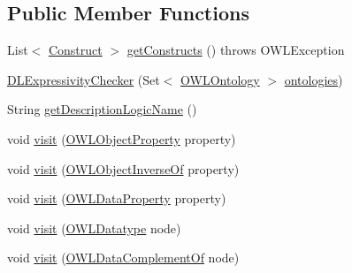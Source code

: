 \subsection*{Public Member Functions}
\begin{DoxyCompactItemize}
\item 
List$<$ \hyperlink{enumorg_1_1semanticweb_1_1owlapi_1_1util_1_1_d_l_expressivity_checker_1_1_construct}{Construct} $>$ \hyperlink{classorg_1_1semanticweb_1_1owlapi_1_1util_1_1_d_l_expressivity_checker_a150225c2aaba844ce7d5bb4d0683c54b}{get\-Constructs} ()  throws O\-W\-L\-Exception 
\item 
\hyperlink{classorg_1_1semanticweb_1_1owlapi_1_1util_1_1_d_l_expressivity_checker_a9a9394efa40a370173acb3d96f9e15b4}{D\-L\-Expressivity\-Checker} (Set$<$ \hyperlink{interfaceorg_1_1semanticweb_1_1owlapi_1_1model_1_1_o_w_l_ontology}{O\-W\-L\-Ontology} $>$ \hyperlink{classorg_1_1semanticweb_1_1owlapi_1_1util_1_1_d_l_expressivity_checker_affc39ee4929c0905abba809420579080}{ontologies})
\item 
String \hyperlink{classorg_1_1semanticweb_1_1owlapi_1_1util_1_1_d_l_expressivity_checker_a889d2e2ab26836bf4e107708d6773270}{get\-Description\-Logic\-Name} ()
\item 
void \hyperlink{classorg_1_1semanticweb_1_1owlapi_1_1util_1_1_d_l_expressivity_checker_a28212e633db3aa51d531532738fce409}{visit} (\hyperlink{interfaceorg_1_1semanticweb_1_1owlapi_1_1model_1_1_o_w_l_object_property}{O\-W\-L\-Object\-Property} property)
\item 
void \hyperlink{classorg_1_1semanticweb_1_1owlapi_1_1util_1_1_d_l_expressivity_checker_aa2f54bcffa42a83a740903681c5fcdc4}{visit} (\hyperlink{interfaceorg_1_1semanticweb_1_1owlapi_1_1model_1_1_o_w_l_object_inverse_of}{O\-W\-L\-Object\-Inverse\-Of} property)
\item 
void \hyperlink{classorg_1_1semanticweb_1_1owlapi_1_1util_1_1_d_l_expressivity_checker_a3844e006dcc4d0baafc650dcc43cf8d1}{visit} (\hyperlink{interfaceorg_1_1semanticweb_1_1owlapi_1_1model_1_1_o_w_l_data_property}{O\-W\-L\-Data\-Property} property)
\item 
void \hyperlink{classorg_1_1semanticweb_1_1owlapi_1_1util_1_1_d_l_expressivity_checker_acfee0ec6bbeb3e651cbc5b7d4833aece}{visit} (\hyperlink{interfaceorg_1_1semanticweb_1_1owlapi_1_1model_1_1_o_w_l_datatype}{O\-W\-L\-Datatype} node)
\item 
void \hyperlink{classorg_1_1semanticweb_1_1owlapi_1_1util_1_1_d_l_expressivity_checker_a945c1d6fa7845a7b7aad3af894393a43}{visit} (\hyperlink{interfaceorg_1_1semanticweb_1_1owlapi_1_1model_1_1_o_w_l_data_complement_of}{O\-W\-L\-Data\-Complement\-Of} node)

\end{DoxyCompactItemize}
